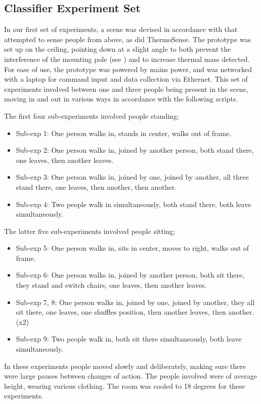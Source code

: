 \documentclass[../thesis/thesis.tex]{subfiles}
\begin{document}
\subsection{Classifier Experiment Set}
In our first set of experiments, a scene was devised in accordance with  that attempted to sense people from above, as did ThermoSense. The prototype was set up on the ceiling, pointing down at a slight angle to both prevent the interference of the mounting pole (see ) and to increase thermal mass detected. For ease of use, the prototype was powered by mains power, and was networked with a laptop for command input and data collection via Ethernet. This set of experiments involved between one and three people being present in the scene, moving in and out in various ways in accordance with the following scripts.

The first four sub-experiments involved people standing;
\begin{itemize}
\item Sub-exp 1: One person walks in, stands in center, walks out of frame.
\item Sub-exp 2: One person walks in, joined by another person, both stand there, one leaves, then another leaves.
\item Sub-exp 3: One person walks in, joined by one, joined by another, all three stand there, one leaves, then another, then another.
\item Sub-exp 4: Two people walk in simultaneously, both stand there, both leave simultaneously.
\end{itemize}

The latter five sub-experiments involved people sitting;
\begin{itemize}
\item Sub-exp 5: One person walks in, sits in center, moves to right, walks out of frame.
\item Sub-exp 6: One person walks in, joined by another person, both sit there, they stand and switch chairs, one leaves, then another leaves.
\item Sub-exp 7, 8: One person walks in, joined by one, joined by another, they all sit there, one leaves, one shuffles position, then another leaves, then another. (x2)
\item Sub-exp 9: Two people walk in, both sit there simultaneously, both leave simultaneously.
\end{itemize}

In these experiments people moved slowly and deliberately, making sure there were large pauses between changes of action. The people involved were of average height, wearing various clothing. The room was cooled to 18 degrees for these experiments.
\end{document}
